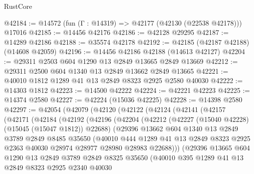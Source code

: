 \begin{lexlean}{RustCore}
\begin{coremodule}
@42184 := @14572 (fun (Γ : @14319) => @42177 (@42130 (@22538 @42178))) @17016
@42185 := @14456 @42176
@42186 := @42128 @29295
@42187 := @14289 @42186
@42188 := @35574 @42178
@42192 := @42185 (@42187 @42188) (@14608 @42059)
@42196 := @14456 @42186 @42188 (@14613 @42127)
@42204 := @29311 @2503 @604 @1290 @13 @2849 @13665 @2849 @13669
@42212 := @29311 @2500 @604 @1340 @13 @2849 @13662 @2849 @13665
@42221 := @40010 @1812 @1289 @41 @13 @2849 @8323 @2925 @2580 @40030
@42222 := @14303 @1812
@42223 := @14500 @42222
@42224 := @42221 @42223
@42225 := @14374 @2580
@42227 := @42224 (@15036 @42225)
@42228 := @14398 @2580
@42297 := @42054
    (@42079
      (@42120
        (@42122
          (@42124
            (@42141
              (@42157
                (@42171
                  (@42184
                    (@42192
                      (@42196
                        (@42204
                          (@42212
                            (@42227 (@15040 @42228) (@15045 (@15047 @1812)) @22688)
                            (@29396
                              @13662
                              @604
                              @1340
                              @13
                              @2849
                              @3789
                              @2849
                              @8485
                              @35650
                              (@40010
                                @444
                                @1289
                                @41
                                @13
                                @2849
                                @8323
                                @2925
                                @2363
                                @40030
                                @28974
                                @28977
                                @28980
                                @28983
                                @22688)))
                          (@29396
                            @13665
                            @604
                            @1290
                            @13
                            @2849
                            @3789
                            @2849
                            @8325
                            @35650
                            (@40010
                              @395
                              @1289
                              @41
                              @13
                              @2849
                              @8323
                              @2925
                              @2340
                              @40030

\end{coremodule}
\end{lexlean}
